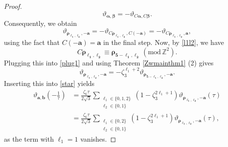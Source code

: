 \documentclass[12pt,reqno]{amsart}
\renewcommand{\a}{\alpha}
\renewcommand{\b}{\beta}
\renewcommand{\t}{\tau}
\newcommand{\z}{\zeta}
\renewcommand{\(}{\left\(}
\renewcommand{\)}{\right\)}
\numberwithin{equation}{section}
\theoremstyle{plain}
\theoremstyle{definition}
\numberwithin{equation}{section}
\renewcommand{\pmod}[1]{\ \left( \mathrm{mod} \, #1 \right)}
\begin{document}
\begin{proof}
\[
\vartheta_{\bm{\a},\bm{\b}}=-\vartheta_{C\bm{\a},C\bm{\b}}.
\]
Consequently, we obtain
\begin{equation}\label{plug1}%
\vartheta_{\bm{\rho_{\ell_1,\ell_2}},-\bm{a}}=-\vartheta_{C\bm{\rho_{\ell_1,\ell_2}},C(-\bm{a})}=-\vartheta_{C\bm{\rho_{\ell_1,\ell_2}},\bm{a}},
\end{equation}
 using the fact that $C(-\bm{a})=\bm{a}$ in the final step. Now, by \eqref{l1l2}, we have 
\[
C\bm{\rho_{\ell_1,\ell_2}}\equiv \bm{\rho_{5-\ell_1,\ell_2}}\pmod{\mathbb{Z}^2}.
\]
Plugging this into \eqref{plug1} and using Theorem \ref{Zwmainthm1} (2) gives 
\[
\vartheta_{\bm{\rho_{\ell_1,\ell_2}},-\bm{a}}%
=-\z^{\ell_1+2}_3\vartheta_{\bm{\rho_{5-\ell_1,\ell_2}},-\bm{a}}.
\]
 Inserting this into \eqref{star} yields 
\begin{align}\label{ref3}
\vartheta_{\bm{a},\bm{b}}\left(-\frac{1}{\t}\right)&=\frac{\z_6\t}{2\sqrt{3}}\sum_{\substack{\ell_1\in\{0,1,2\}\\\ell_2\in\{0,1\}}}\left(1-\z^{2\ell_1+1}_3\right)\vartheta_{\bm{\rho_{\ell_1,\ell_2}},-\bm{a}}(\t)\nonumber\\
&=\frac{\z_6\t}{2\sqrt{3}}\sum_{\substack{\ell_1\in\{0,2\}\\\ell_2\in\{0,1\}}}\left(1-\z^{2\ell_1+1}_3\right)\vartheta_{\bm{\rho_{\ell_1,\ell_2}},-\bm{a}}(\t),
\end{align}
as the term with $\ell_1=1$ vanishes.


\end{proof}
\end{document}
